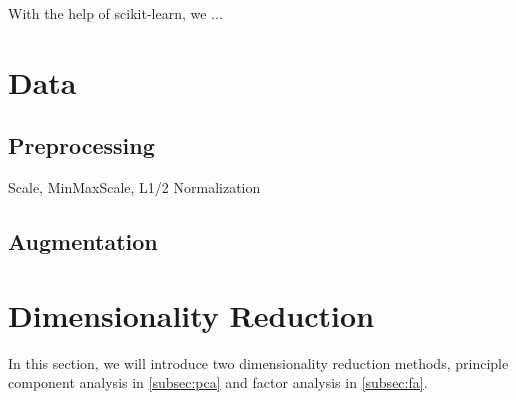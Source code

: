\documentclass[10pt,journal,compsoc]{IEEEtran}
\begin{document}
\maketitle


\IEEEdisplaynontitleabstractindextext



%
\IEEEpeerreviewmaketitle




With the help of scikit-learn\cite{scikit-learn}, we ...


\section{Data}
\label{sec:data}

\subsection{Preprocessing}
\label{subsec:preprocessing}
Scale, MinMaxScale, L1/2 Normalization

\subsection{Augmentation}
\label{subsec:augmentation}

\section{Dimensionality Reduction}
\label{sec:dimensionality_reduction}
In this section, we will introduce two dimensionality reduction methods, principle component analysis in \ref{subsec:pca} and factor analysis in \ref{subsec:fa}.
\end{document}
